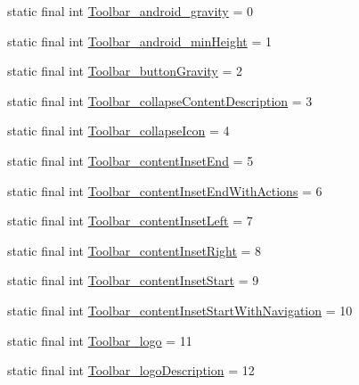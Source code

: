 \begin{DoxyCompactItemize}
static final int \mbox{\hyperlink{classcom_1_1synnapps_1_1carouselview_1_1_r_1_1styleable_ac8e6f6aa8ee4d8b138a6824391d69edb}{Toolbar\+\_\+android\+\_\+gravity}} = 0
\item 
static final int \mbox{\hyperlink{classcom_1_1synnapps_1_1carouselview_1_1_r_1_1styleable_a671a2d8eaf75f72fce1b2f6bb3f6bb01}{Toolbar\+\_\+android\+\_\+min\+Height}} = 1
\item 
static final int \mbox{\hyperlink{classcom_1_1synnapps_1_1carouselview_1_1_r_1_1styleable_ab8a47690b347d59c6ca3f3160c7f2f49}{Toolbar\+\_\+button\+Gravity}} = 2
\item 
static final int \mbox{\hyperlink{classcom_1_1synnapps_1_1carouselview_1_1_r_1_1styleable_a05331dc1028c101ea733093d4b2ee65d}{Toolbar\+\_\+collapse\+Content\+Description}} = 3
\item 
static final int \mbox{\hyperlink{classcom_1_1synnapps_1_1carouselview_1_1_r_1_1styleable_ac04558f2a2a9d1a98080b7795be65fea}{Toolbar\+\_\+collapse\+Icon}} = 4
\item 
static final int \mbox{\hyperlink{classcom_1_1synnapps_1_1carouselview_1_1_r_1_1styleable_a68bd71fac87213cac4614e62a7e8931f}{Toolbar\+\_\+content\+Inset\+End}} = 5
\item 
static final int \mbox{\hyperlink{classcom_1_1synnapps_1_1carouselview_1_1_r_1_1styleable_aa0d257e252843029298f8217f1754230}{Toolbar\+\_\+content\+Inset\+End\+With\+Actions}} = 6
\item 
static final int \mbox{\hyperlink{classcom_1_1synnapps_1_1carouselview_1_1_r_1_1styleable_a6502c3897488b3f78139b6f747df6305}{Toolbar\+\_\+content\+Inset\+Left}} = 7
\item 
static final int \mbox{\hyperlink{classcom_1_1synnapps_1_1carouselview_1_1_r_1_1styleable_a2c501aacc808fc5d7e49e6fdf0699769}{Toolbar\+\_\+content\+Inset\+Right}} = 8
\item 
static final int \mbox{\hyperlink{classcom_1_1synnapps_1_1carouselview_1_1_r_1_1styleable_a402c2095a4ff745892bae78dbd0d8e2e}{Toolbar\+\_\+content\+Inset\+Start}} = 9
\item 
static final int \mbox{\hyperlink{classcom_1_1synnapps_1_1carouselview_1_1_r_1_1styleable_aa251ffe16bd0dd8139e0a8936758be5f}{Toolbar\+\_\+content\+Inset\+Start\+With\+Navigation}} = 10
\item 
static final int \mbox{\hyperlink{classcom_1_1synnapps_1_1carouselview_1_1_r_1_1styleable_a7859117f9e97dcc23a0f6c65bf6d16d1}{Toolbar\+\_\+logo}} = 11
\item 
static final int \mbox{\hyperlink{classcom_1_1synnapps_1_1carouselview_1_1_r_1_1styleable_a5b482089ec2d24628701afbd3a96dce5}{Toolbar\+\_\+logo\+Description}} = 12

\end{DoxyCompactItemize}
